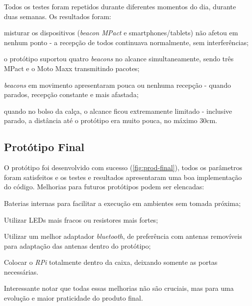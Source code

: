 \documentclass[
		12pt,				%
		openright,			%
		oneside,			%
		a4paper,			%
		chapter=TITLE,		%
		english,			%
		brazil				%
	]{abntex2}
\begin{document}
Todos os testes foram repetidos durante diferentes momentos do dia, durante duas semanas. Os resultados foram:

\begin{alineas}
	\item misturar os dispositivos (\textit{beacon MPact} e smartphones/tablets) não afetou em nenhum ponto - a recepção de todos continuava normalmente, sem interferências;
	\item o protótipo suportou quatro \textit{beacons} no alcance simultaneamente, sendo três MPact e o Moto Maxx transmitindo pacotes;
	\item \textit{beacons} em movimento apresentaram pouca ou nenhuma recepção - quando parados, recepção constante e mais afastada;
	\item quando no bolso da calça, o alcance ficou extremamente limitado - inclusive parado, a distância até o protótipo era muito pouca, no máximo 30cm.
\end{alineas}

\subsection{Protótipo Final}\label{sec:prototipo-final}

O protótipo foi desenvolvido com sucesso (\autoref{fig:prod-final}), todos os parâmetros foram satisfeitos e os testes e resultados apresentaram uma boa implementação do código. Melhorias para futuros protótipos podem ser elencadas:

\begin{alineas}
	\item Baterias internas para facilitar a execução em ambientes sem tomada próxima;
	\item Utilizar LEDs mais fracos ou resistores mais fortes;
	\item Utilizar um melhor adaptador \textit{bluetooth}, de preferência com antenas removíveis para adaptação das antenas dentro do protótipo;
	\item Colocar o \textit{RPi} totalmente dentro da caixa, deixando somente as portas necessárias.
\end{alineas}

Interessante notar que todas essas melhorias não são cruciais, mas para uma evolução e maior praticidade do produto final.
\end{document}
